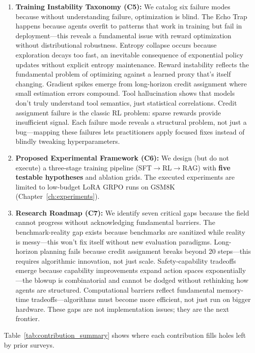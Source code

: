 \documentclass[12pt,a4paper]{report}
\theoremstyle{definition}
\begin{document}
\begin{enumerate}
    \item \textbf{Training Instability Taxonomy (C5):} We catalog six failure modes because without understanding failure, optimization is blind. The Echo Trap happens because agents overfit to patterns that work in training but fail in deployment—this reveals a fundamental issue with reward optimization without distributional robustness. Entropy collapse occurs because exploration decays too fast, an inevitable consequence of exponential policy updates without explicit entropy maintenance. Reward instability reflects the fundamental problem of optimizing against a learned proxy that's itself changing. Gradient spikes emerge from long-horizon credit assignment where small estimation errors compound. Tool hallucination shows that models don't truly understand tool semantics, just statistical correlations. Credit assignment failure is the classic RL problem: sparse rewards provide insufficient signal. Each failure mode reveals a structural problem, not just a bug—mapping these failures lets practitioners apply focused fixes instead of blindly tweaking hyperparameters.

    \item \textbf{Proposed Experimental Framework (C6):} We design (but do not execute) a three-stage training pipeline (SFT$\rightarrow$RL$\rightarrow$RAG) with \textbf{five testable hypotheses} and ablation grids. The executed experiments are limited to low-budget LoRA GRPO runs on GSM8K (Chapter~\ref{ch:experiments}).

    \item \textbf{Research Roadmap (C7):} We identify seven critical gaps because the field cannot progress without acknowledging fundamental barriers. The benchmark-reality gap exists because benchmarks are sanitized while reality is messy—this won't fix itself without new evaluation paradigms. Long-horizon planning fails because credit assignment breaks beyond 20 steps—this requires algorithmic innovation, not just scale. Safety-capability tradeoffs emerge because capability improvements expand action spaces exponentially—the blowup is combinatorial and cannot be dodged without rethinking how agents are structured. Computational barriers reflect fundamental memory-time tradeoffs—algorithms must become more efficient, not just run on bigger hardware. These gaps are not implementation issues; they are the next frontier.
\end{enumerate}

\noindent Table~\ref{tab:contribution_summary} shows where each contribution fills holes left by prior surveys.
\end{document}
